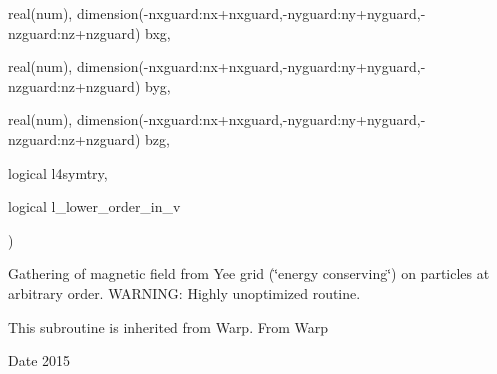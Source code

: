 {\begin{DoxyParamCaption}
\item[{real(num), dimension(-\/nxguard\+:nx+nxguard,-\/nyguard\+:ny+nyguard,-\/nzguard\+:nz+nzguard)}]{bxg, }
\item[{real(num), dimension(-\/nxguard\+:nx+nxguard,-\/nyguard\+:ny+nyguard,-\/nzguard\+:nz+nzguard)}]{byg, }
\item[{real(num), dimension(-\/nxguard\+:nx+nxguard,-\/nyguard\+:ny+nyguard,-\/nzguard\+:nz+nzguard)}]{bzg, }
\item[{logical}]{l4symtry, }
\item[{logical}]{l\+\_\+lower\+\_\+order\+\_\+in\+\_\+v}
\end{DoxyParamCaption}
)}\hypertarget{field__gathering_8_f90_a3d18b5a2fca069b67c4e49c7d1559dd8}{}\label{field__gathering_8_f90_a3d18b5a2fca069b67c4e49c7d1559dd8}


Gathering of magnetic field from Yee grid (\char`\"{}energy conserving\char`\"{}) on particles at arbitrary order. W\+A\+R\+N\+I\+NG\+: Highly unoptimized routine. 

This subroutine is inherited from Warp.  From Warp \begin{DoxyDate}{Date}
2015 
\end{DoxyDate}
